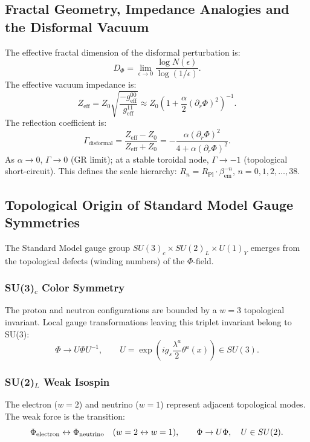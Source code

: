 \documentclass[12pt, a4paper]{article}
\begin{document}
\subsection{Fractal Geometry, Impedance Analogies and the Disformal Vacuum}
The effective fractal dimension of the disformal perturbation is:
\begin{equation}
D_{\Phi} = \lim_{\epsilon \to 0} \frac{\log N(\epsilon)}{\log(1/\epsilon)}.
\end{equation}
The effective vacuum impedance is:
\begin{equation}
Z_{\mathrm{eff}} = Z_0 \sqrt{\frac{-g_{\mathrm{eff}}^{00}}{g_{\mathrm{eff}}^{11}}} \approx Z_0 \left(1 + \frac{\alpha}{2} (\partial_r \Phi)^2 \right)^{-1}.
\end{equation}
The reflection coefficient is:
\begin{equation}
\Gamma_{\mathrm{disformal}} = \frac{Z_{\mathrm{eff}} - Z_0}{Z_{\mathrm{eff}} + Z_0} = -\frac{\alpha(\partial_r \Phi)^2}{4 + \alpha(\partial_r \Phi)^2}.
\end{equation}
As $\alpha \to 0$, $\Gamma \to 0$ (GR limit); at a stable toroidal node, $\Gamma \to -1$ (topological short-circuit). This defines the scale hierarchy: $R_n = R_{\mathrm{Pl}} \cdot \beta_{\mathrm{em}}^{-n}$, $n=0,1,2,\ldots,38$.

\subsection{Topological Origin of Standard Model Gauge Symmetries}
The Standard Model gauge group $SU(3)_c \times SU(2)_L \times U(1)_Y$ emerges from the topological defects (winding numbers) of the $\Phi$-field.

\subsubsection{SU(3)$_c$ Color Symmetry}
The proton and neutron configurations are bounded by a $w=3$ topological invariant. Local gauge transformations leaving this triplet invariant belong to SU(3):
\begin{equation}
\Phi \to U \Phi U^{-1}, \qquad U = \exp\left( i g_s \frac{\lambda^a}{2} \theta^a(x) \right) \in SU(3).
\end{equation}

\subsubsection{SU(2)$_L$ Weak Isospin}
The electron ($w=2$) and neutrino ($w=1$) represent adjacent topological modes. The weak force is the transition:
\begin{equation}
\Phi_{\rm electron} \leftrightarrow \Phi_{\rm neutrino} \quad (w=2 \leftrightarrow w=1), \qquad \Phi \to U \Phi, \quad U\in SU(2).
\end{equation}
\end{document}
